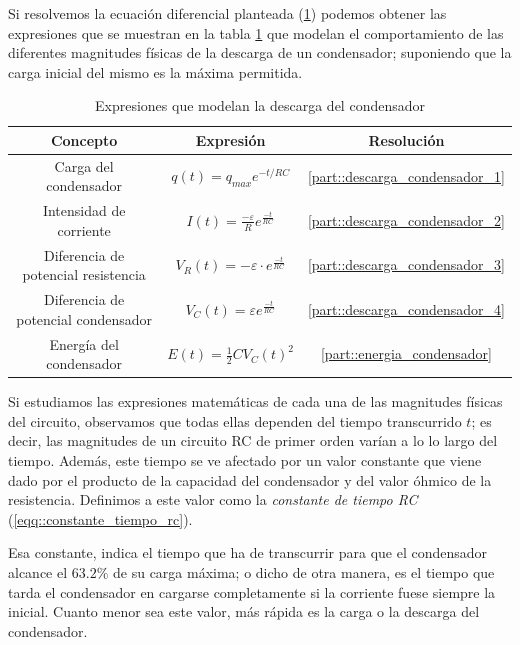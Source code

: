 \documentclass[../main.tex]{subfiles}
\begin{document}
Si resolvemos la ecuación diferencial planteada (\ref{tab::ecuaciones_descarga_rc}) podemos obtener las expresiones que se muestran en la tabla \ref{tab::ecuaciones_descarga_rc} que modelan el comportamiento de las diferentes magnitudes físicas de la descarga de un condensador; suponiendo que la carga inicial del mismo es la máxima permitida.

\begin{table}[!ht]
    \begin{center}
        \begin{tabular}{|| c | c | c ||}
            \hline
            \textbf{Concepto} & \textbf{Expresión} &  \textbf{Resolución}\\ \hline
            Carga del condensador & $q(t) = q_{max} e^{-t/{RC}}$ & \ref{part::descarga_condensador_1} \\
            Intensidad de corriente & $I(t) = \frac{-\varepsilon}{R}e^{\frac{-t}{RC}}$ & \ref{part::descarga_condensador_2} \\
            Diferencia de potencial resistencia & $V_R(t) = -\varepsilon \cdot e^{\frac{-t}{RC}}$ & \ref{part::descarga_condensador_3} \\ 
            Diferencia de potencial condensador & $V_C(t) = \varepsilon   e^{\frac{-t}{RC}}$ & \ref{part::descarga_condensador_4} \\ 
            Energía del condensador & $E(t) = \frac{1}{2}CV_C(t)^2 $ & \ref{part::energia_condensador} \\
            \hline
            \end{tabular}
            \caption{Expresiones que modelan la descarga del condensador}
            \label{tab::ecuaciones_descarga_rc}
    \end{center}
\end{table}



Si estudiamos las expresiones matemáticas de cada una de las magnitudes físicas del circuito, observamos que todas ellas dependen del tiempo transcurrido $t$; es decir, las magnitudes de un circuito RC de primer orden varían a lo lo largo del tiempo. Además, este tiempo se ve afectado por un valor constante que viene dado por el producto de la capacidad del condensador y del valor óhmico de la resistencia. Definimos a este valor como la \textit{constante de tiempo RC} (\ref{eqq::constante_tiempo_rc}). 

Esa constante, indica el tiempo que ha de transcurrir para que el condensador alcance el $63.2\%$ de su carga máxima; o dicho de otra manera, es el tiempo que tarda el condensador en cargarse completamente si la corriente fuese siempre la inicial. Cuanto menor sea este valor, más rápida es la carga o la descarga del condensador.
\end{document}

